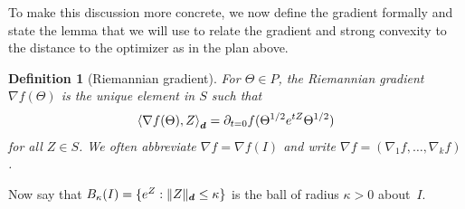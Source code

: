 \documentclass{article}
\newtheorem{definition}{Definition}
\DeclarePairedDelimiter{\norm}{\lVert}{\rVert}
\renewcommand{\vec}{\bm}
\begin{document}
To make this discussion more concrete, we now define the gradient formally and state the lemma that we will use to relate the gradient and strong convexity to the distance to the optimizer as in the plan above.

\begin{definition}[Riemannian gradient]
For $\Theta \in P$, the \emph{Riemannian gradient}~$\nabla f(\Theta)$ is the unique element in $S$ such that
\begin{align*}
  \braket{\nabla f(\Theta), Z}_{\vec d} = \partial_{t=0} f(\Theta^{1/2} e^{tZ} \Theta^{1/2})
\end{align*}
for all $Z\in S$.
We often abbreviate $\nabla f = \nabla f(I)$ and write $\nabla f = (\nabla_1 f, \dots, \nabla_k f)$.
\end{definition}

\noindent
Now say that $B_\kappa(I) = \{ e^Z : \norm Z_{\vec d} \leq \kappa \}$ is the ball of radius $\kappa>0$ about~$I$.
\end{document}
